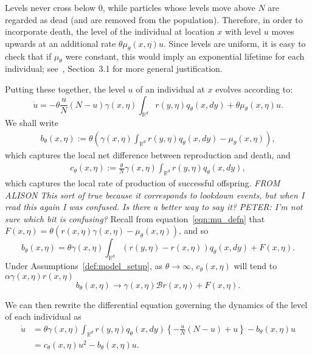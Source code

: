 \documentclass[12pt]{article}
\newcommand{\IR}{\mathbb R}
\newcommand{\DG}{\mathcal{B}}  %
\newcommand{\comment}[1]{{\color{blue} \it #1}}
\numberwithin{equation}{section}
\begin{document}
Levels never cross below 0,
while particles whose levels move above $N$ are regarded as dead
(and are removed from the population).
Therefore, in order to incorporate death,
the level of the individual at location $x$ with level $u$
moves upwards at an additional rate $\theta\mu_\theta(x,\eta) u$.
Since levels are uniform,
it is easy to check that if $\mu_\theta$ were constant,
this would imply an exponential lifetime for each individual;
see~\cite{etheridge/kurtz:2019}, Section~3.1
for more general justification.

Putting these together,
the level $u$ of an individual at $x$ evolves according to:
\begin{equation} \label{eqn:dot_u}
    \dot u
    =
    - \theta\frac{u}{N} \left(N - u\right)
    \gamma(x, \eta) \int_{\IR^d} r(y, \eta) q_\theta(x, dy) 
    +
    \theta\mu_\theta(x,\eta) u .
\end{equation}
We shall write 
\begin{align*}
    b_\theta(x, \eta)
    :=
    \theta\left(
    \gamma(x,\eta) \int_{\IR^d} r(y, \eta) q_\theta(x, dy)
    -
    \mu_\theta(x,\eta)
    \right) ,
\end{align*}
which captures the local net difference between reproduction and death,
and
\begin{align} \label{c_defn}
    c_\theta(x, \eta)
    :=
    \frac{\theta}{N} \gamma(x, \eta) \int_{\IR^d} r(y, \eta) q_\theta(x, dy) ,
\end{align}
which captures the local rate of production of successful offspring.
\comment{FROM ALISON This sort of true because it corresponds to lookdown events, but when I read this again I was confused. Is there a better way to say it?} 
\comment{PETER: I'm not sure which bit is confusing?}
Recall from equation~\eqref{eqn:mu_defn} that
$F(x,\eta) = \theta(r(x,\eta)\gamma(x,\eta) - \mu_\theta(x,\eta))$,
and so 
\begin{equation}  \label{b_defn}
b_\theta(x, \eta)
=    \theta \gamma(x, \eta) \int_{\IR^d} \left( r(y, \eta) - r(x, \eta) \right) 
	q_\theta(x, dy)
    + F(x, \eta). 
\end{equation}
Under Assumptions~\ref{def:model_setup}, as $\theta \to \infty$,
$c_\theta(x, \eta)$ will tend to $\alpha \gamma(x, \eta) r(x, \eta)$
\begin{equation}
\label{eqn:b_limit}
    b_\theta(x, \eta) \to \gamma(x, \eta) \DG r(x, \eta) + F(x, \eta) .
\end{equation}

We can then rewrite the differential equation 
governing the dynamics of the level of each individual as
\begin{align}
\dot{u}
    &=
    \theta\gamma(x,\eta) \int_{\IR^d} r(y, \eta) q_\theta(x, dy)
    \left\{
        -\frac{u}{N}\left(N - u\right)
        + u
    \right\}
    -
	b_\theta(x,\eta) u
    \nonumber \\
    &=
    c_\theta(x, \eta) u^2
    -
	b_\theta(x, \eta) u
    . \label{differential equation for level}
\end{align}
\end{document}

